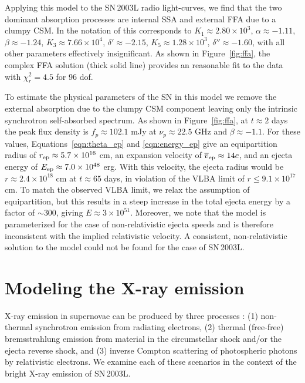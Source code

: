 \documentclass[12pt,preprint]{aastex}
\begin{document}
Applying this model to the SN\,2003L radio light-curves, we
find that the two dominant absorption processes are internal SSA and
external FFA due to a clumpy CSM.  In the notation of \citet{wpm01}
this corresponds to $K_1\approx 2.80 \times 10^3$, $\alpha \approx
-1.11$, $\beta \approx -1.24$, $K_3 \approx 7.66\times 10^4$, $\delta
' \approx -2.15$, $K_5 \approx 1.28 \times 10^3$, $\delta '' \approx
-1.60$, with all other parameters effectively insignificant.  As shown
in Figure~\ref{fig:ffa}, the complex FFA solution (thick solid line)
provides an reasonable fit to the data with $\chi^2_r=4.5$ for 96 dof.

To estimate the physical parameters of the SN in this model we remove
the external absorption due to the clumpy CSM component leaving only
the intrinsic synchrotron self-absorbed spectrum.  As shown in
Figure~\ref{fig:ffa}, at $t\approx 2$ days the peak flux density is
$f_p\approx 102.1$ mJy at $\nu_p\approx 22.5$ GHz and $\beta \approx
-1.1$.  For these values, Equations~\ref{eqn:theta_ep} and
\ref{eqn:energy_ep} give an equipartition radius of $r_{\rm ep}\approx
5.7\times 10^{16}$ cm, an expansion velocity of $\overline{v}_{\rm
ep}\approx 14c$, and an ejecta energy of $E_{\rm ep}\approx 7.0\times
10^{48}$ erg.  With this velocity, the ejecta radius would be
$r\approx 2.4\times 10^{18}$ cm at $t\approx 65$ days, in violation of
the VLBA limit of $r\le 9.1\times 10^{17}$ cm.  To match the observed
VLBA limit, we relax the assumption of equipartition, but this results
in a steep increase in the total ejecta energy by a factor of $\sim
300$, giving $E\approx 3\times 10^{51}$.  Moreover, we note that the
model is parameterized for the case of non-relativistic ejecta speeds
and is therefore inconsistent with the implied relativistic
velocity.  A consistent, non-relativistic solution to the
\citet{wpm01} model could not be found for the case of SN\,2003L.

\section{Modeling the X-ray emission}
\label{sec:xray_model}

X-ray emission in supernovae can be produced by
three processes \citep{flc96}: (1) non-thermal synchrotron emission
from radiating electrons, (2) thermal (free-free) bremsstrahlung
emission from material in the circumstellar shock and/or the ejecta
reverse shock, and (3) inverse Compton scattering of photospheric
photons by relativistic electrons.  We examine each of
these scenarios in the context of the bright X-ray emission of
SN\,2003L.
\end{document}
